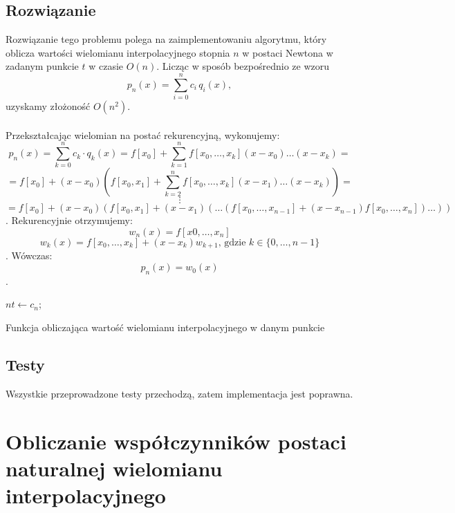 \documentclass{article}
\begin{document}
\subsection{Rozwiązanie}
Rozwiązanie tego problemu polega na zaimplementowaniu algorytmu, który oblicza wartości wielomianu interpolacyjnego stopnia $n$ w postaci Newtona w zadanym punkcie $t$ w czasie $O(n)$. Licząc w sposób bezpośrednio ze wzoru \[
p_n(x) = \sum_{i=0}^n c_i \, q_i(x),
\]
uzyskamy złożoność $O(n^2)$. \\ \\ Przekształcając wielomian na postać rekurencyjną, wykonujemy:
\[p_n(x) = \sum_{k=0}^n c_k\cdot q_k(x) = f[x_0] + \sum_{k=1}^n f[x_0, \dots, x_k](x-x_0)\dots (x-x_k) =\]
\[= f[x_0] + (x-x_0)(f[x_0, x_1] + \sum_{k=2}^n f[x_0, \dots, x_k](x-x_1)\dots (x-x_k)) = \]
\[\vdots\]
\[= f[x_0] + (x-x_0)(f[x_0, x_1] + (x-x_1)(\dots (f[x_0, \dots, x_{n-1}]+(x-x_{n-1})f[x_0, \dots, x_n])\dots))\].
Rekurencyjnie otrzymujemy: 
\[w_n(x) = f[x0, \dots, x_n]\]
\[w_k(x) = f[x_0, \dots, x_k] + (x-x_k)w_{k+1}\text{, gdzie } k \in \{0, \dots, n-1\}\].
Wówczas:
\[p_n(x) = w_0(x)\]
.
\\ 
\begin{algorithm}[H]
\SetAlgoLined
{}
$nt \gets c_n$;


\caption{Funkcja obliczająca wartość wielomianu interpolacyjnego w danym punkcie}
\end{algorithm}
\subsection{Testy}
Wszystkie przeprowadzone testy przechodzą, zatem implementacja jest poprawna.

\section{Obliczanie współczynników postaci naturalnej wielomianu interpolacyjnego}
\end{document}
